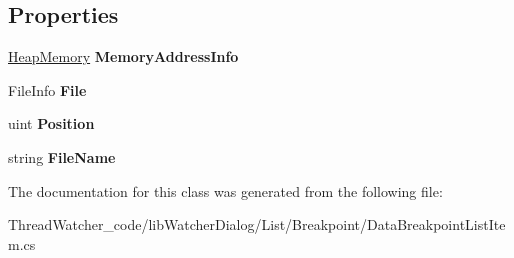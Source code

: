 \subsection*{Properties}
\begin{DoxyCompactItemize}
\item 
\hypertarget{classlib_watcher_dialog_1_1_list_1_1_data_breakpoint_list_item_a932efa87739827c2b4f81515d4a75f52}{\hyperlink{classlib_wather_debugger_1_1_memory_1_1_heap_memory}{Heap\+Memory} {\bfseries Memory\+Address\+Info}}\label{classlib_watcher_dialog_1_1_list_1_1_data_breakpoint_list_item_a932efa87739827c2b4f81515d4a75f52}

\item 
\hypertarget{classlib_watcher_dialog_1_1_list_1_1_data_breakpoint_list_item_a720a3c6142372b237fbcc7c38920d0b6}{File\+Info {\bfseries File}}\label{classlib_watcher_dialog_1_1_list_1_1_data_breakpoint_list_item_a720a3c6142372b237fbcc7c38920d0b6}

\item 
\hypertarget{classlib_watcher_dialog_1_1_list_1_1_data_breakpoint_list_item_ae4ac9d1fdbf335698a54b4e860276da9}{uint {\bfseries Position}}\label{classlib_watcher_dialog_1_1_list_1_1_data_breakpoint_list_item_ae4ac9d1fdbf335698a54b4e860276da9}

\item 
\hypertarget{classlib_watcher_dialog_1_1_list_1_1_data_breakpoint_list_item_af96567b01cf45ce7620d187f6f02f30a}{string {\bfseries File\+Name}}\label{classlib_watcher_dialog_1_1_list_1_1_data_breakpoint_list_item_af96567b01cf45ce7620d187f6f02f30a}

\end{DoxyCompactItemize}


The documentation for this class was generated from the following file\+:\begin{DoxyCompactItemize}
\item 
Thread\+Watcher\+\_\+code/lib\+Watcher\+Dialog/\+List/\+Breakpoint/Data\+Breakpoint\+List\+Item.\+cs\end{DoxyCompactItemize}
